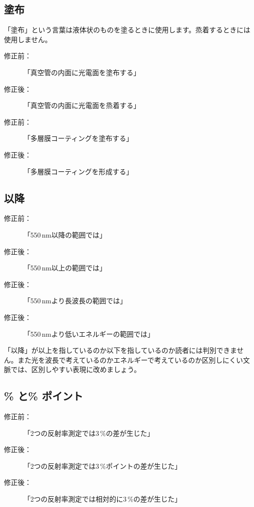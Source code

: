 \subsection{塗布}

「塗布」という言葉は液体状のものを塗るときに使用します。烝着するときには使用しません。

\begin{description}
\item[修正前：]「真空管の内面に光電面を塗布する」
\item[修正後：]「真空管の内面に光電面を烝着する」
\end{description}

\begin{description}
\item[修正前：]「多層膜コーティングを塗布する」
\item[修正後：]「多層膜コーティングを形成する」
\end{description}


\subsection{以降}

\begin{description}
\item[修正前：]「550\,nm以降の範囲では」
\item[修正後：]「550\,nm以上の範囲では」
\item[修正後：]「550\,nmより長波長の範囲では」
\item[修正後：]「550\,nmより低いエネルギーの範囲では」
\end{description}

「以降」が以上を指しているのか以下を指しているのか読者には判別できません。また光を波長で考えているのかエネルギーで考えているのか区別しにくい文脈では、区別しやすい表現に改めましょう。

\subsection{\% と\% ポイント}

\begin{description}
\item[修正前：]「2つの反射率測定では3\,\%の差が生じた」
\item[修正後：]「2つの反射率測定では3\,\%ポイントの差が生じた」
\item[修正後：]「2つの反射率測定では相対的に3\,\%の差が生じた」
\end{description}

